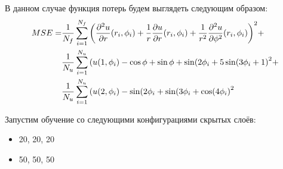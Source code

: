 \documentclass[a4paper,14pt]{extarticle} %
\begin{document}
В данном случае функция потерь будем выглядеть следующим образом:
\begin{equation}\label{eq:termal_cond}
    \begin{split}
        MSE =& \frac{1}{N_f}\sum_{i=1}^{N_f} {\left(  \frac{\partial^2 u}{\partial r}(r_i, \phi_i) + \frac{1}{r} \frac{\partial u}{\partial r}(r_i, \phi_i) + \frac{1}{r^2}\frac{\partial^2 u}{\partial \phi^2}(r_i, \phi_i) \right)}^2 + \\
        & \frac{1}{N_u}\sum_{i=1}^{N_u} {\left( u(1, \phi_i) - \cos\phi+\sin\phi+\sin(2\phi_i+5\sin(3\phi_i+1 \right)}^2 + \\
        & \frac{1}{N_u}\sum_{i=1}^{N_u} {\left( u(2, \phi_i) - \sin(2\phi_i+\sin(3\phi_i+\cos(4\phi_i \right)}^2
    \end{split}
\end{equation}

Запустим обучение со следующими конфигурациями скрытых слоёв:
\begin{itemize}
    \item 20, 20, 20
    \item 50, 50, 50
\end{itemize}


\end{document}
